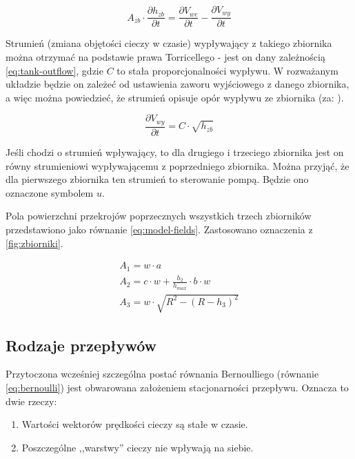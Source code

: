 \begin{equation}\label{eq:tank-mass-balance}
    A_{zb} \cdot \frac{\partial h_{zb}}{\partial t} = \frac{\partial V_{we}}{\partial t} - \frac{\partial V_{wy}}{\partial t}
\end{equation}

Strumień (zmiana objętości cieczy w czasie) wypływający z takiego zbiornika można otrzymać na podstawie prawa Torricellego - jest on dany zależnością \ref{eq:tank-outflow}, gdzie $C$ to stała proporcjonalności wypływu. W rozważanym układzie będzie on zależeć od ustawienia zaworu wyjściowego z danego zbiornika, a więc można powiedzieć, że strumień opisuje opór wypływu ze zbiornika (za: \cite{TanksManual}).

\begin{equation}\label{eq:tank-outflow}
\frac{\partial V_{wy}}{\partial t} = C\cdot\sqrt{h_{zb}}
\end{equation}

Jeśli chodzi o strumień wpływający, to dla drugiego i trzeciego zbiornika jest on równy strumieniowi wypływającemu z poprzedniego zbiornika. Można przyjąć, że dla pierwszego zbiornika ten strumień to sterowanie pompą. Będzie ono oznaczone symbolem $u$.

Pola powierzchni przekrojów poprzecznych wszystkich trzech zbiorników przedstawiono jako równanie \ref{eq:model-fields}. Zastosowano oznaczenia z \ref{fig:zbiorniki}.

\begin{equation}\label{eq:model-fields}
    \begin{array}{lr}
        A_{1} = w \cdot a \\
        A_{2} = c\cdot w + \frac{h_{2}}{h_{max}}\cdot b\cdot w \\
        A_{3} = w\cdot \sqrt{R^{2} - (R - h_{3})^{2}}
    \end{array}
\end{equation}

\subsection{Rodzaje przepływów}
\label{sub:plyny-przeplywy}

Przytoczona wcześniej szczególna postać równania Bernoulliego (równanie \ref{eq:bernoulli}) jest obwarowana założeniem stacjonarności przepływu. Oznacza to dwie rzeczy:
\begin{enumerate}
    \item Wartości wektorów prędkości cieczy są stałe w czasie.
    \item Poszczególne ,,warstwy'' cieczy nie wpływają na siebie.
\end{enumerate}


